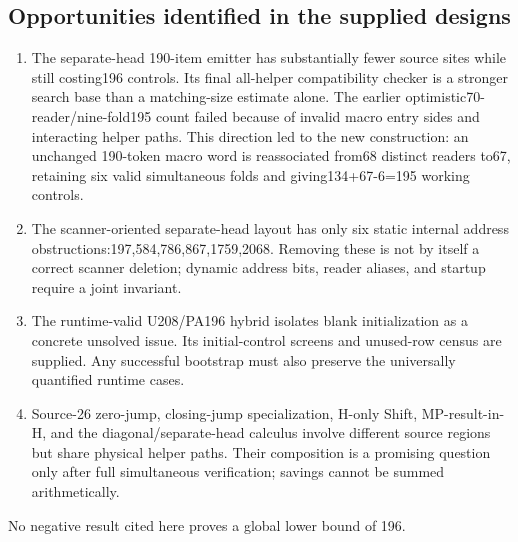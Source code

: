 \subsection{Opportunities identified in the supplied designs}

\begin{enumerate}
\item The separate-head 190-item emitter has substantially fewer source sites
while still costing196 controls. Its final all-helper compatibility
checker is a stronger search base than a matching-size estimate alone.
The earlier optimistic70-reader/nine-fold195 count failed because of
invalid macro entry sides and interacting helper paths. This direction
led to the new construction: an unchanged 190-token macro word is
reassociated from68 distinct readers to67, retaining six valid
simultaneous folds and giving134+67-6=195 working controls.
\item The scanner-oriented separate-head layout has only six static internal
address obstructions:197,584,786,867,1759,2068. Removing these is not by
itself a correct scanner deletion; dynamic address bits, reader aliases,
and startup require a joint invariant.
\item The runtime-valid U208/PA196 hybrid isolates blank initialization as a
concrete unsolved issue. Its initial-control screens and unused-row
census are supplied. Any successful bootstrap must also preserve the
universally quantified runtime cases.
\item Source-26 zero-jump, closing-jump specialization, H-only Shift,
MP-result-in-H, and the diagonal/separate-head calculus involve different
source regions but share physical helper paths. Their composition is a
promising question only after full simultaneous verification; savings
cannot be summed arithmetically.
\end{enumerate}

No negative result cited here proves a global lower bound of 196.

